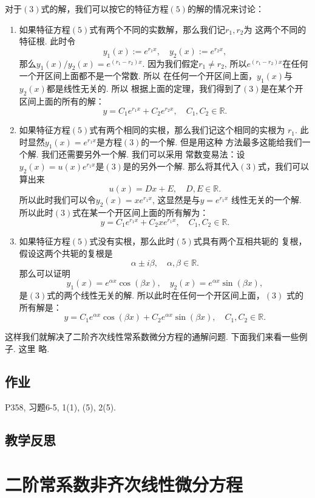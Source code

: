 \documentclass[a4paper, titlepage, twoside]{article}
\numberwithin{equation}{section}
\begin{document}
对于$(3)$式的解，我们可以按它的特征方程$(5)$的解的情况来讨论：
\begin{enumerate}
	\item 如果特征方程$(5)$式有两个不同的实数解，那么我们记$r_1, r_2$为
		这两个不同的特征根. 此时令
		$$ y_1(x):=e^{r_1x}, \quad y_2(x):=e^{r_2x}, $$
		那么$y_1(x)/y_2(x)=e^{(r_1-r_2)x}$. 因为我们假定$r_1\neq r_2$, 
		所以$e^{(r_1-r_2)x}$在任何一个开区间上面都不是一个常数. 所以
		在任何一个开区间上面，$y_1(x)$与$y_2(x)$都是线性无关的. 所以
		根据上面的定理，我们得到了$(3)$是在某个开区间上面的所有的解：
		$$ y= C_1 e^{r_1x} + C_2 e^{r_2x}, \quad C_1, C_2\in
		\mathbb{R}.$$
	\item 如果特征方程$(5)$式有两个相同的实根，那么我们记这个相同的实根为
		$r_1$.
		此时显然$y_1(x)=e^{r_1x}$是方程$(3)$的一个解. 但是用这种
		方法最多这能给我们一个解. 我们还需要另外一个解. 我们可以采用
		常数变易法：设$y_2(x)= u(x)e^{r_1x}$是$(3)$是的另外一个解. 
		那么将其代入$(3)$式，我们可以算出来
		$$ u(x) = Dx +E, \quad D, E \in \mathbb{R}.$$
		所以此时我们可以令$y_2(x)=xe^{r_1x}$, 这显然是与$y=e^{r_1x}$ 
		线性无关的一个解. 所以此时$(3)$式在某一个开区间上面的所有解为：
		$$ y= C_1 e^{r_1x } + C_2 xe^{r_1x}, \quad C_1, C_2\in
		\mathbb{R}.$$
	\item 如果特征方程$(5)$式没有实根，那么此时$(5)$式具有两个互相共轭的
		复根，假设这两个共轭的复根是
		$$ \alpha \pm i\beta, \quad \alpha, \beta\in \mathbb{R}. $$
		那么可以证明
		$$ y_1(x)= e^{\alpha x} \cos(\beta x), \quad y_2(x)=e^{\alpha
		x}\sin(\beta x),$$
		是$(3)$式的两个线性无关的解. 所以此时在任何一个开区间上面，$(3)$
		式的所有解是：
		$$ y= C_1 e^{\alpha x} \cos(\beta x) + C_2 e^{\alpha x}
		\sin(\beta x), \quad C_1, C_2 \in \mathbb{R}.$$
\end{enumerate}

这样我们就解决了二阶齐次线性常系数微分方程的通解问题. 下面我们来看一些例子. 这里
略. 




\subsection{作业}

P358, 习题6-5, 1(1), (5), 2(5).
\subsection{教学反思}


\section{二阶常系数非齐次线性微分方程}
\end{document}
